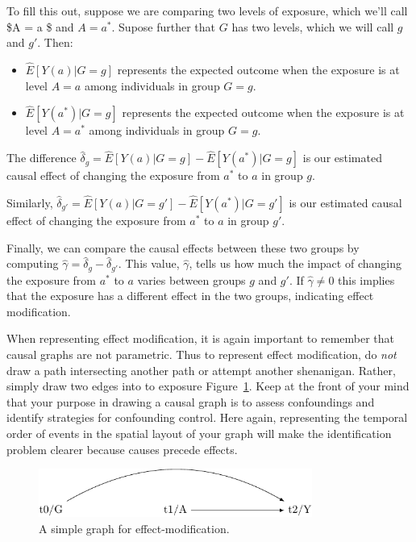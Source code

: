 \documentclass[
  singlecolumn]{report}
\begin{document}
To fill this out, suppose we are comparing two levels of exposure, which
we'll call \$A = a \$ and \(A= a^*\). Supose further that \(G\) has two
levels, which we will call \(g\) and \(g'\). Then:

\begin{itemize}
\item
  \(\hat{E}[Y(a)|G=g]\) represents the expected outcome when the
  exposure is at level \(A=a\) among individuals in group \(G=g\).
\item
  \(\hat{E}[Y(a^*)|G=g]\) represents the expected outcome when the
  exposure is at level \(A=a^*\) among individuals in group \(G=g\).
\end{itemize}

The difference
\(\hat{\delta}_g = \hat{E}[Y(a)|G=g] - \hat{E}[Y(a^*)|G=g]\) is our
estimated causal effect of changing the exposure from \(a^*\) to \(a\)
in group \(g\).

Similarly,
\(\hat{\delta}_{g'} = \hat{E}[Y(a)|G=g'] - \hat{E}[Y(a^*)|G=g']\) is our
estimated causal effect of changing the exposure from \(a^*\) to \(a\)
in group \(g'\).

Finally, we can compare the causal effects between these two groups by
computing \(\hat{\gamma} = \hat{\delta}_g - \hat{\delta}_{g'}\). This
value, \(\hat{\gamma}\), tells us how much the impact of changing the
exposure from \(a^*\) to \(a\) varies between groups \(g\) and \(g'\).
If \(\hat{\gamma}\neq 0\) this implies that the exposure has a different
effect in the two groups, indicating effect modification.

When representing effect modification, it is again important to remember
that causal graphs are not parametric. Thus to represent effect
modification, do \emph{not} draw a path intersecting another path or
attempt another shenanigan. Rather, simply draw two edges into to
exposure Figure~\ref{fig-dag-effect-modfication}. Keep at the front of
your mind that your purpose in drawing a causal graph is to assess
confoundings and identify strategies for confounding control. Here
again, representing the temporal order of events in the spatial layout
of your graph will make the identification problem clearer because
causes precede effects.

\begin{figure}

{\centering \includegraphics[width=0.8\textwidth,height=\textheight]{causal-dags_files/figure-pdf/fig-dag-effect-modfication-1.pdf}

}

\caption{\label{fig-dag-effect-modfication}A simple graph for
effect-modification.}

\end{figure}
\end{document}
